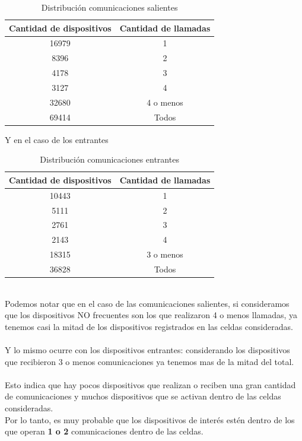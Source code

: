 \documentclass[12pt]{report}
\begin{document}
	\begin{table}[h]
		\centering
		\begin{tabular}{|c|c|}
			\hline
			Cantidad de dispositivos & Cantidad de llamadas\\
			\hline
			16979 & 1\\
			8396 & 2\\
			4178 & 3\\
			3127 & 4\\
			\hline
			32680 & 4 o menos\\
			\hline
			69414 & Todos\\
			\hline
		\end{tabular}
		\caption{Distribución comunicaciones salientes}
		\label{tab:t1}
	\end{table}
	Y en el caso de los entrantes
	\begin{table}[h]
		\centering
		\begin{tabular}{|c|c|}
			\hline
			Cantidad de dispositivos & Cantidad de llamadas\\
			\hline
			10443 & 1\\
			5111 & 2\\
			2761 & 3\\
			2143 & 4\\
			\hline
			18315 & 3 o menos\\
			\hline
			36828 & Todos\\
			\hline
		\end{tabular}
		\caption{Distribución comunicaciones entrantes}
		\label{tab:t2}
	\end{table}
	\\
	Podemos notar que en el caso de las comunicaciones salientes, si consideramos que los dispositivos NO frecuentes son los que realizaron 4 o menos llamadas, ya tenemos casi la mitad de los dispositivos registrados en las celdas consideradas.\\
	\\
	Y lo mismo ocurre con los dispositivos entrantes: considerando los dispositivos que recibieron 3 o menos comunicaciones ya tenemos mas de la mitad del total.\\
	\\
	Esto indica que hay pocos dispositivos que realizan o reciben una gran cantidad de comunicaciones y muchos dispositivos que se activan dentro de las celdas consideradas.\\
	Por lo tanto, es muy probable que los dispositivos de interés estén dentro de los que operan \textbf{1 o 2} comunicaciones dentro de las celdas.
\end{document}
